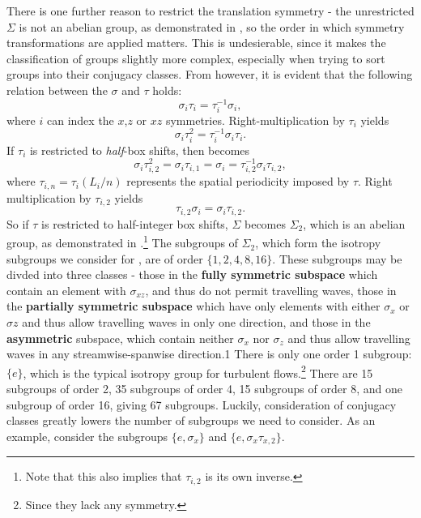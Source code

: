 There is one further reason to restrict the translation symmetry - the unrestricted $\Sigma$ is not an abelian group, as demonstrated in , so the order in which symmetry transformations are applied matters. This is undesierable, since it makes the classification of groups slightly more complex, especially when trying to sort groups into their conjugacy classes. From  however, it is evident that the following relation between the $\sigma$ and $\tau$ holds:
\begin{equation}
\sigma_{i}\tau_{i} = \tau_i^{-1}\sigma_i,
\end{equation}
where $i$ can index the $x$,$z$ or $xz$ symmetries. Right-multiplication by $\tau_i$ yields
\begin{equation}\label{eq:pscom}
\sigma_i\tau_i^2 = \tau_i^{-1}\sigma_i\tau_i.
\end{equation}
If $\tau_i$ is restricted to \emph{half}-box shifts, then  becomes
\begin{equation}
\sigma_i\tau_{i,2}^2 = \sigma_i\tau_{i,1} = \sigma_i = \tau_{i,2}^{-1}\sigma_{i}\tau_{i,2},
\end{equation}
where $\tau_{i,n} = \tau_i(L_i/n)$ represents the spatial periodicity imposed by $\tau$. Right multiplication by $\tau_{i,2}$ yields
\begin{equation}
\tau_{i,2}\sigma_{i} = \sigma_{i}\tau_{i,2}.
\end{equation}
So if $\tau$ is restricted to half-integer box shifts, $\Sigma$ becomes $\Sigma_2$, which is an abelian group, as demonstrated in .\footnote{Note that this also implies that $\tau_{i,2}$ is its own inverse.} The subgroups of $\Sigma_2$, which form the isotropy subgroups we consider for \pCf, are of order $\{1,2,4,8,16\}$. These subgroups may be divded into three classes - those in the {\bf fully symmetric subspace} which contain an element with $\sigma_{xz}$, and thus do not permit travelling waves, those in the {\bf partially symmetric subspace} which have only elements with either $\sigma_{x}$ or $\sigma{z}$ and thus allow travelling waves in only one direction, and those in the {\bf asymmetric} subspace, which contain neither $\sigma_x$ nor $\sigma_z$ and thus allow travelling waves in any streamwise-spanwise direction.1 There is only one order 1 subgroup: $\{ e \}$, which is the typical isotropy group for turbulent flows.\footnote{Since they lack any symmetry.} There are 15 subgroups of order 2, 35 subgroups of order 4, 15 subgroups of order 8, and one subgroup of order 16, giving 67 subgroups. Luckily, consideration of conjugacy classes greatly lowers the number of subgroups we need to consider. As an example, consider the subgroups $\{ e, \sigma_x\}$ and $\{e, \sigma_x\tau_{x,2}\}$.
